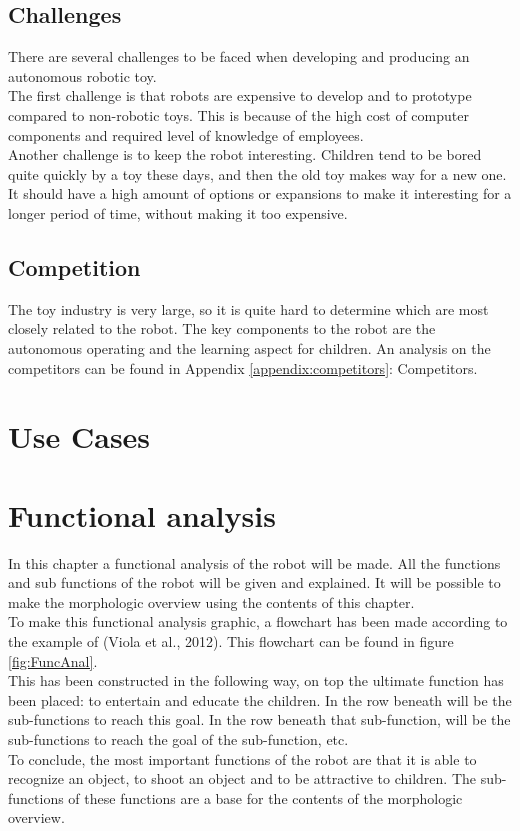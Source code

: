 \documentclass[11pt,twoside,a4paper]{report}
\begin{document}
\section{Challenges}
There are several challenges to be faced when developing and producing an autonomous robotic toy. \\
The first challenge is that robots are expensive to develop and to prototype compared to non-robotic toys. This is because of the high cost of computer components and required level of knowledge of employees.\\
Another challenge is to keep the robot interesting. Children tend to be bored quite quickly by a toy these days, and then the old toy makes way for a new one. It should have a high amount of options or expansions to make it interesting for a longer period of time, without making it too expensive. 
\section{Competition}
The toy industry is very large, so it is quite hard to determine which are most closely related to the robot. The key components to the robot are the autonomous operating and the learning aspect for children. An analysis on the competitors can be found in Appendix \ref{appendix:competitors}: Competitors.

\chapter{Use Cases}
\chapter{Functional analysis}
In this chapter a functional analysis of the robot will be made. All the functions and sub functions of the robot will be given and explained. It will be possible to make the morphologic overview using the contents of this chapter. \\
To make this functional analysis graphic, a flowchart has been made according to the example of (Viola et al., 2012). This flowchart can be found in figure \ref{fig:FuncAnal}.\\
This has been constructed in the following way, on top the ultimate function has been placed: to entertain and educate the children. In the row beneath will be the sub-functions to reach this goal. In the row beneath that sub-function, will be the sub-functions to reach the goal of the sub-function, etc. \\
To conclude, the most important functions of the robot are that it is able to recognize an object, to shoot an object and to be attractive to children. The sub-functions of these functions are a base for the contents of the morphologic overview. 
\end{document}
